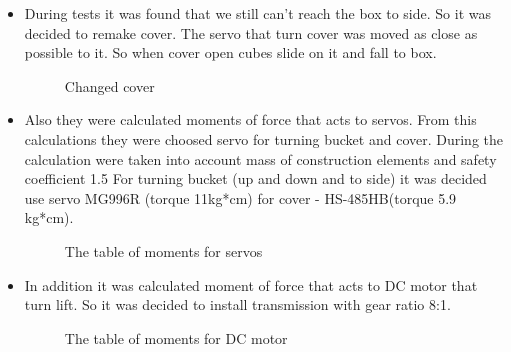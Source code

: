 \begin{itemize}
\item During tests it was found that we still can't reach the box to side. So it was decided to remake cover. The servo that turn cover was moved as close as possible to it. So when cover open cubes slide on it and fall to box. 
\begin{figure}[H]
	\begin{minipage}[h]{\linewidth}
		\caption{Changed cover}
	\end{minipage}
\end{figure}
\item Also they were calculated moments of force that acts to servos. From this calculations they were choosed servo for turning bucket and cover. During the calculation were taken into account mass of construction elements and safety coefficient 1.5 For turning bucket (up and down and to side) it was decided use servo MG996R (torque 11kg*cm) for cover - HS-485HB(torque 5.9 kg*cm).
\begin{figure}[H]
	\begin{minipage}[h]{\linewidth}
		\caption{The table of moments for servos}
	\end{minipage}
\end{figure}
\item In addition it was calculated moment of force that acts to DC motor that turn lift. So it was decided to install transmission with gear ratio 8:1.
\begin{figure}[H]
	\begin{minipage}[h]{\linewidth}
		\caption{The table of moments for DC motor}
	\end{minipage}
\end{figure}
\end{itemize}
\fillpage
